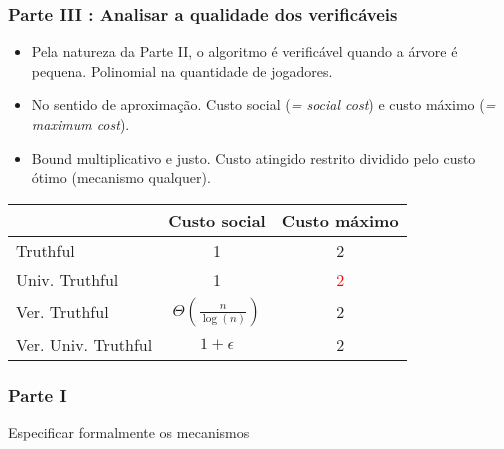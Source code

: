 \documentclass{beamer}
\begin{document}
\begin{frame}
\frametitle{Parte III : Analisar a qualidade dos verificáveis}
\begin{itemize}
\item Pela natureza da Parte II, o algoritmo é verificável quando a árvore é pequena. Polinomial na quantidade de jogadores.
\item No sentido de aproximação. Custo social (\textit{= social cost}) e custo máximo (\textit{= maximum cost}).
\item Bound multiplicativo e justo. Custo atingido restrito dividido pelo custo ótimo (mecanismo qualquer).
\end{itemize}

\begin{table}
\begin{tabular}{l c c}
\toprule
 & \textbf{Custo social} & \textbf{Custo máximo}\\
\midrule
Truthful & 1 & 2 \\
Univ. Truthful & 1 & \textcolor{red}{2} \\
\midrule
Ver. Truthful & $\Theta(\frac{n}{\log(n)})$ & 2 \\
Ver. Univ. Truthful & $1 + \epsilon$ & 2 \\
\bottomrule
\end{tabular}
\end{table}
\end{frame}

\begin{frame}
\frametitle{Parte I}
Especificar formalmente os mecanismos
\end{frame}
\end{document}
